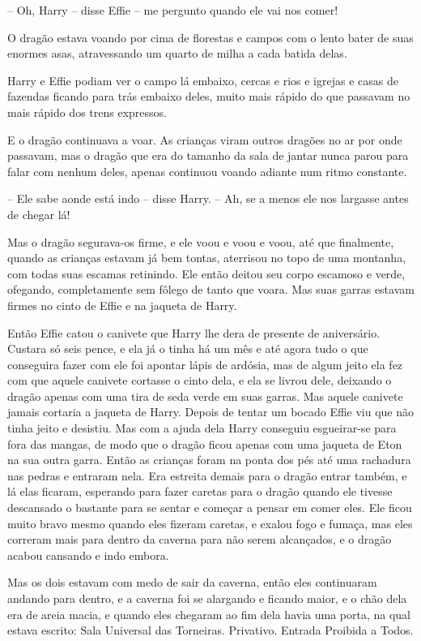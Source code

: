 -- Oh, Harry -- disse Effie -- me pergunto quando ele vai nos comer!

O dragão estava voando por cima de florestas e campos com o lento
bater de suas enormes asas, atravessando um quarto de milha a cada
batida delas.

Harry e Effie podiam ver o campo lá embaixo, cercas e rios e igrejas e
casas de fazendas ficando para trás embaixo deles, muito mais rápido
do que passavam no mais rápido dos trens expressos.

E o dragão continuava a voar. As crianças viram outros dragões no ar
por onde passavam, mas o dragão que era do tamanho da sala de jantar
nunca parou para falar com nenhum deles, apenas continuou voando
adiante num ritmo constante.

-- Ele sabe aonde está indo -- disse Harry. -- Ah, se a menos ele nos
largasse antes de chegar lá!

Mas o dragão segurava-os firme, e ele voou e voou e voou, até que
finalmente, quando as crianças estavam já bem tontas, aterrisou no
topo de uma montanha, com todas suas escamas retinindo. Ele então
deitou seu corpo escamoso e verde, ofegando, completamente sem fôlego
de tanto que voara. Mas suas garras estavam firmes no cinto de Effie
e na jaqueta de Harry.

Então Effie catou o canivete que Harry lhe dera de presente de
aniversário. Custara só seis pence, e ela já o tinha há um mês e até
agora tudo o que conseguira fazer com ele foi apontar lápis de
ardósia, mas de algum jeito ela fez com que aquele canivete cortasse
o cinto dela, e ela se livrou dele, deixando o dragão apenas com uma
tira de seda verde em suas garras. Mas aquele canivete jamais
cortaria a jaqueta de Harry. Depois de tentar um bocado Effie viu que
não tinha jeito e desistiu. Mas com a ajuda dela Harry conseguiu
esgueirar-se para fora das mangas, de modo que o dragão ficou apenas
com uma jaqueta de Eton na sua outra garra. Então as crianças foram
na ponta dos pés até uma rachadura nas pedras e entraram nela. Era
estreita demais para o dragão entrar também, e lá elas ficaram,
esperando para fazer caretas para o dragão quando ele tivesse
descansado o bastante para se sentar e começar a pensar em comer
eles. Ele ficou muito bravo mesmo quando eles fizeram caretas, e
exalou fogo e fumaça, mas eles correram mais para dentro da caverna
para não serem alcançados, e o dragão acabou cansando e indo embora.

Mas os dois estavam com medo de sair da caverna, então eles
continuaram andando para dentro, e a caverna foi se alargando e
ficando maior, e o chão dela era de areia macia, e quando eles
chegaram ao fim dela havia uma porta, na qual estava escrito: Sala
Universal das Torneiras. Privativo. Entrada Proibida a Todos.

